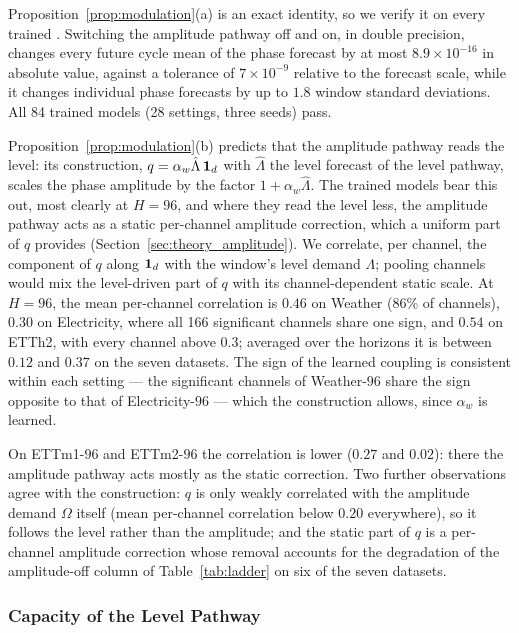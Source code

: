 {
Proposition~\ref{prop:modulation}(a) is an exact identity, so we verify it on every trained \sysplus. Switching the amplitude pathway off and on, in double precision, changes every future cycle mean of the phase forecast by at most $8.9\times10^{-16}$ in absolute value, against a tolerance of $7\times10^{-9}$ relative to the forecast scale, while it changes individual phase forecasts by up to $1.8$ window standard deviations. All 84 trained models (28 settings, three seeds) pass.

Proposition~\ref{prop:modulation}(b) predicts that the amplitude pathway reads the level: its construction, $q=\alpha_w\hat\Lambda\,\mathbf 1_d$ with $\hat\Lambda$ the level forecast of the level pathway, scales the phase amplitude by the factor $1+\alpha_w\hat\Lambda$. The trained models bear this out, most clearly at $H=96$, and where they read the level less, the amplitude pathway acts as a static per-channel amplitude correction, which a uniform part of $q$ provides (Section~\ref{sec:theory_amplitude}). We correlate, per channel, the component of $q$ along $\mathbf 1_d$ with the window's level demand $\Lambda$; pooling channels would mix the level-driven part of $q$ with its channel-dependent static scale. At $H=96$, the mean per-channel correlation is $0.46$ on Weather (86\% of channels), $0.30$ on Electricity, where all 166 significant channels share one sign, and $0.54$ on ETTh2, with every channel above $0.3$; averaged over the horizons it is between $0.12$ and $0.37$ on the seven datasets. The sign of the learned coupling is consistent within each setting --- the significant channels of Weather-$96$ share the sign opposite to that of Electricity-$96$ --- which the construction allows, since $\alpha_w$ is learned.

On ETTm1-$96$ and ETTm2-$96$ the correlation is lower ($0.27$ and $0.02$): there the amplitude pathway acts mostly as the static correction. Two further observations agree with the construction: $q$ is only weakly correlated with the amplitude demand $\Omega$ itself (mean per-channel correlation below $0.20$ everywhere), so it follows the level rather than the amplitude; and the static part of $q$ is a per-channel amplitude correction whose removal accounts for the degradation of the amplitude-off column of Table~\ref{tab:ladder} on six of the seven datasets.

\subsubsection{Capacity of the Level Pathway}
\label{sec:exp_capacity}

}

